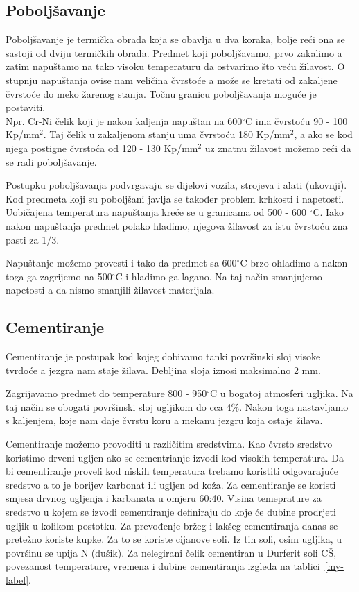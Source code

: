 \documentclass[a4paper,12pt]{article}
\numberwithin{figure}{section}
\begin{document}
\subsection{Poboljšavanje}
Poboljšavanje je termička obrada koja se obavlja u dva koraka, bolje reći ona se sastoji od dviju termičkih obrada. Predmet koji poboljšavamo, prvo zakalimo a zatim napuštamo na tako visoku temperaturu da ostvarimo što veću žilavost. O stupnju napuštanja ovise nam veličina čvrstoće a može se kretati od zakaljene čvrstoće do meko žarenog stanja. Točnu granicu poboljšavanja moguće je postaviti.\\
Npr. Cr-Ni čelik koji je nakon kaljenja napuštan na 600$^{\circ}$C ima čvrstoću 90 - 100 Kp/mm$^{2}$. Taj čelik u zakaljenom stanju uma čvrstoću 180 Kp/mm$^{2}$, a ako se kod njega postigne čvrstoća od 120 - 130 Kp/mm$^{2}$ uz znatnu žilavost možemo reći da se radi poboljšavanje. \par
Postupku poboljšavanja podvrgavaju se dijelovi vozila, strojeva i alati (ukovnji). Kod predmeta koji su poboljšani javlja se također problem krhkosti i napetosti. Uobičajena temperatura napuštanja kreće se u granicama od 500 - 600 $^{\circ}$C. Iako nakon napuštanja predmet polako hladimo, njegova žilavost za istu čvrstoću zna pasti za 1/3.\par
Napuštanje možemo provesti i tako da predmet sa 600$^{\circ}$C brzo ohladimo a nakon toga ga zagrijemo na 500$^{\circ}$C i hladimo ga lagano. Na taj način smanjujemo napetosti a da nismo smanjili žilavost materijala.
\subsection{Cementiranje}
Cementiranje je postupak kod kojeg dobivamo tanki površinski sloj visoke tvrdoće a jezgra nam staje žilava. Debljina sloja iznosi maksimalno 2 mm. \par
Zagrijavamo predmet do temperature 800 - 950$^{\circ}$C u bogatoj atmosferi ugljika. Na taj način se obogati površinski sloj ugljikom do cca 4$\%$. Nakon toga nastavljamo s kaljenjem, koje nam daje čvrstu koru a mekanu jezgru koja ostaje žilava.\par
Cementiranje možemo provoditi u različitim sredstvima. Kao čvrsto sredstvo koristimo drveni ugljen ako se cementrianje izvodi kod visokih temperatura. Da bi cementiranje proveli kod niskih temperatura trebamo koristiti odgovarajuće sredstvo a to je borijev karbonat ili ugljen od koža. Za cementiranje se koristi smjesa drvnog ugljenja i karbanata u  omjeru 60:40. Visina temeprature za sredstvo u kojem se izvodi cementiranje definiraju do koje će dubine prodrjeti ugljik u kolikom postotku. Za prevođenje bržeg i lakšeg cementiranja danas se pretežno koriste kupke. Za to se koriste cijanove soli. Iz tih soli, osim ugljika, u površinu se upija N (dušik). Za nelegirani čelik cementiran u Durferit soli CŠ, povezanost temperature, vremena i dubine cementiranja izgleda na tablici~\ref{my-label}.
\end{document}
